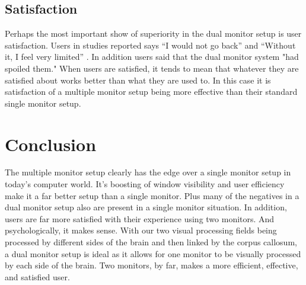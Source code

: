 \documentclass[a4paper]{article}
\begin{document}
\subsection{Satisfaction}
Perhaps the most important show of superiority in the dual monitor setup is user satisfaction. Users in studies reported says ``I would not go back'' and ``Without it, I feel very limited'' \cite{Grudin}. In addition users said that the dual monitor system "had spoiled them."\cite{Grudin} When users are satisfied, it tends to mean that whatever they are satisfied about works better than what they are used to. In this case it is satisfaction of a multiple monitor setup being more effective than their standard single monitor setup.

\section{Conclusion}
The multiple monitor setup clearly has the edge over a single monitor setup in today's computer world. It's boosting of window visibility and user efficiency make it a far better setup than a single monitor. Plus many of the negatives in a dual monitor setup also are present in a single monitor situation. In addition, users are far more satisfied with their experience using two monitors. And psychologically, it makes sense. With our two visual processing fields being processed by different sides of the brain and then linked by the corpus callosum, a dual monitor setup is ideal as it allows for one monitor to be visually processed by each side of the brain. Two monitors, by far, makes a more efficient, effective, and satisfied user.



\end{document}
